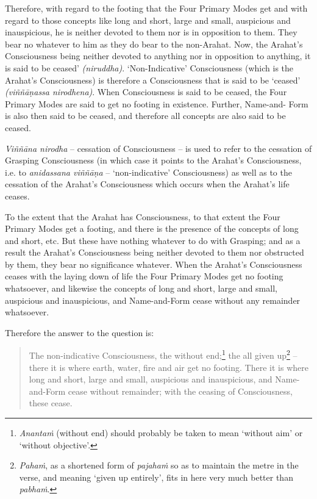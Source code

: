 Therefore, with regard to the footing that the Four Primary Modes get and with regard to those concepts like long and short, large and small, auspicious and inauspicious, he is neither devoted to them nor is in opposition to them. They bear no  whatever to him as they do bear to the non-Arahat. Now, the Arahat's Consciousness being neither devoted to anything nor in opposition to anything, it is said to be ceased' \emph{(niruddha)}. `Non-Indicative' Consciousness (which is the Arahat's Consciousness) is therefore a Consciousness that is said to be `ceased' \emph{(viññāṇassa nirodhena)}. When Consciousness is said to be ceased, the Four Primary Modes are said to get no footing in existence. Further, Name-and- Form is also then said to be ceased, and therefore all concepts are also said to be ceased.

\emph{Viññāna nirodha} -- cessation of Consciousness -- is used to refer to the cessation of Grasping Consciousness (in which case it points to the Arahat's Consciousness, i.e. to \emph{anidassana viññāṇa} -- `non-indicative' Consciousness) as well as to the cessation of the Arahat's Consciousness which occurs when the Arahat's life ceases.

To the extent that the Arahat has Consciousness, to that extent the Four Primary Modes get a footing, and there is the presence of the concepts of long and short, etc. But these have nothing whatever to do with Grasping; and as a result the Arahat's Consciousness being neither devoted to them nor obstructed by them, they bear no significance whatever. When the Arahat's Consciousness ceases with the laying down of life the Four Primary Modes get no footing whatsoever, and likewise the concepts of long and short, large and small, auspicious and inauspicious, and Name-and-Form cease without any remainder whatsoever.

\clearpage

Therefore the answer to the question is:

\begin{quote}
The non-indicative Consciousness, the without end;\footnote{\emph{Anantaṁ} (without end) should probably be taken to mean `without aim' or `without objective'.} the all given up\footnote{\emph{Pahaṁ}, as a shortened form of \emph{pajahaṁ} so as to maintain the metre in the verse, and meaning `given up entirely', fits in here very much better than \emph{pabhaṁ}.} -- there it is where earth, water, fire and air get no footing. There it is where long and short, large and small, auspicious and inauspicious, and Name-and-Form cease without remainder; with the ceasing of Consciousness, these cease.
\end{quote}

